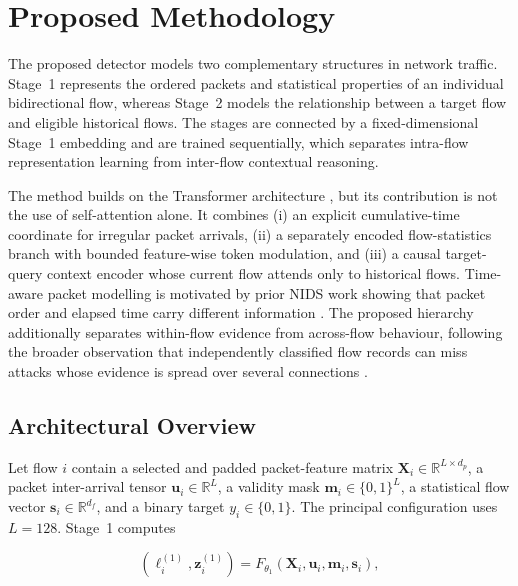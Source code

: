 \documentclass[11pt,fleqn]{report}
\begin{document}
\chapter{Proposed Methodology}
\label{sec:proposed_methodology}

The proposed detector models two complementary structures in network traffic. Stage~1 represents the ordered packets and statistical properties of an individual bidirectional flow, whereas Stage~2 models the relationship between a target flow and eligible historical flows. The stages are connected by a fixed-dimensional Stage~1 embedding and are trained sequentially, which separates intra-flow representation learning from inter-flow contextual reasoning.

The method builds on the Transformer architecture \cite{Vaswani2017}, but its contribution is not the use of self-attention alone. It combines (i) an explicit cumulative-time coordinate for irregular packet arrivals, (ii) a separately encoded flow-statistics branch with bounded feature-wise token modulation, and (iii) a causal target-query context encoder whose current flow attends only to historical flows. Time-aware packet modelling is motivated by prior NIDS work showing that packet order and elapsed time carry different information \cite{Han2023GTID}. The proposed hierarchy additionally separates within-flow evidence from across-flow behaviour, following the broader observation that independently classified flow records can miss attacks whose evidence is spread over several connections
\cite{LiuPatras2022NetSentry,Manocchio2024FlowTransformer, MartinReizabal2026FlowWindow}.

\section{Architectural Overview}
\label{subsec:method_architecture}

Let flow $i$ contain a selected and padded packet-feature matrix
$\mathbf{X}_i\in\mathbb{R}^{L\times d_p}$, a packet inter-arrival tensor
$\mathbf{u}_i\in\mathbb{R}^{L}$, a validity mask
$\mathbf{m}_i\in\{0,1\}^{L}$, a statistical flow vector
$\mathbf{s}_i\in\mathbb{R}^{d_f}$, and a binary target
$y_i\in\{0,1\}$. The principal configuration uses $L=128$. Stage~1 computes

\begin{equation}
    \left(\boldsymbol{\ell}^{(1)}_i,\mathbf{z}^{(1)}_i\right)
    =F_{\theta_1}
    \left(
        \mathbf{X}_i,\mathbf{u}_i,\mathbf{m}_i,\mathbf{s}_i
    \right),
    \label{eq:method_stage1_mapping}
\end{equation}
\end{document}
